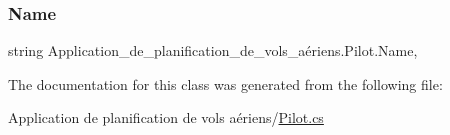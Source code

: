 \subsubsection{\texorpdfstring{Name}{Name}}
{\footnotesize\ttfamily string Application\+\_\+de\+\_\+planification\+\_\+de\+\_\+vols\+\_\+aériens.\+Pilot.\+Name\hspace{0.3cm}{\ttfamily [get]}, {\ttfamily [set]}}



The documentation for this class was generated from the following file\+:\begin{DoxyCompactItemize}
\item 
Application de planification de vols aériens/\hyperlink{_pilot_8cs}{Pilot.\+cs}\end{DoxyCompactItemize}

